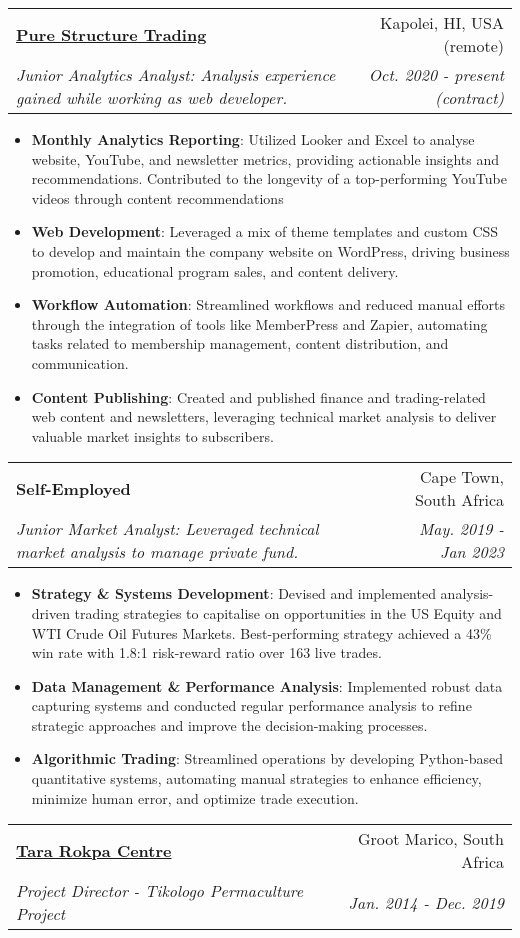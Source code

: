 \documentclass[a4paper,11pt]{article}
\makeatletter
\newcommand{\resumeItem}[2]{
  \item\small{
    \textbf{#1}{: #2 \vspace{-2pt}}
  }
}
\newcommand{\resumeSubheading}[4]{
  \vspace{-1pt}\item
    \begin{tabular*}{0.97\textwidth}[t]{l@{\extracolsep{\fill}}r}
      \textbf{#1} & #2 \\
      \textit{\small#3} & \textit{\small #4} \\
  \end{tabular*}\vspace{-10pt}
}
\newcommand{\resumeItemListStart}{\begin{itemize}}
\newcommand{\resumeItemListEnd}{\end{itemize}\vspace{-10pt}}
\makeatother
\begin{document}
    \resumeSubheading
      {\href{http://purestructuretrading.com/education}{Pure Structure Trading }}{Kapolei, HI, USA (remote)}
      {Junior Analytics Analyst: Analysis experience gained while working as web developer.}{Oct. 2020 - present (contract)}
      
      \resumeItemListStart
        \resumeItem{Monthly Analytics Reporting}
          {Utilized Looker and Excel to analyse website, YouTube, and newsletter metrics, providing actionable insights and recommendations. Contributed to the longevity of a top-performing YouTube videos through content recommendations}
        \resumeItem{Web Development}
          {Leveraged a mix of theme templates and custom CSS to develop and maintain the company website on WordPress, driving business promotion, educational program sales, and content delivery.}
        \resumeItem{Workflow Automation}
          {Streamlined workflows and reduced manual efforts through the integration of tools like MemberPress and Zapier, automating tasks related to membership management, content distribution, and communication.}
        \resumeItem{Content Publishing}
          {Created and published finance and trading-related web content and newsletters, leveraging technical market analysis to deliver valuable market insights to subscribers.}
      \resumeItemListEnd

    \resumeSubheading
      {Self-Employed}{Cape Town, South Africa}
      {Junior Market Analyst: Leveraged technical market analysis to manage private fund.}{May. 2019 - Jan 2023}
      
      \resumeItemListStart
        \resumeItem{Strategy \& Systems Development}
          {Devised and implemented analysis-driven trading strategies to capitalise on opportunities in the US Equity and WTI Crude Oil Futures Markets. Best-performing strategy achieved a 43\% win rate with 1.8:1 risk-reward ratio over 163 live trades.}
        \resumeItem{Data Management \& Performance Analysis}
          {Implemented robust data capturing systems and conducted regular performance analysis to refine strategic approaches and improve the decision-making processes.}
        \resumeItem{Algorithmic Trading}
          {Streamlined operations by developing Python-based quantitative systems, automating manual strategies to enhance efficiency, minimize human error, and optimize trade execution.}
      \resumeItemListEnd

    \resumeSubheading
      {\href{https://tararokpacentre.co.za/about-tikologo/}{Tara Rokpa Centre}}{Groot Marico, South Africa}
      {Project Director - Tikologo Permaculture Project}{Jan. 2014 - Dec. 2019}
      
\end{document}
